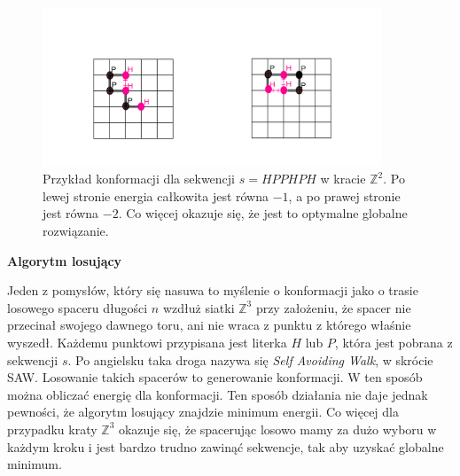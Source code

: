 \documentclass[leqno,10pt]{article}
\begin{document}
\begin{figure}[!htbp]
    \centering
    \includegraphics[width=0.9\textwidth]{diagram.png}
    \caption{Przykład konformacji dla sekwencji $s={HPPHPH}$ w kracie $\mathbb{Z}^{2}$. Po lewej stronie energia całkowita jest równa $-1$, a po prawej stronie jest równa $-2$. Co więcej okazuje się, że jest to optymalne globalne rozwiązanie. }
\end{figure}


\textbf{Algorytm losujący}

Jeden z pomysłów, który się nasuwa to myślenie o konformacji jako o trasie losowego spaceru długości $n$ wzdłuż siatki $\mathbb{Z}^{3}$ przy założeniu, że spacer nie przecinał swojego dawnego toru, ani nie wraca z punktu z którego właśnie wyszedł. Każdemu punktowi przypisana jest literka $H$ lub $P$, która jest pobrana z sekwencji $s$. Po angielsku taka droga nazywa się \textit{Self Avoiding Walk}, w skrócie SAW. Losowanie takich spacerów to generowanie konformacji. W ten sposób można obliczać energię dla konformacji. Ten sposób działania nie daje jednak pewności, że algorytm losujący znajdzie minimum energii. Co więcej dla przypadku kraty $\mathbb{Z}^3$ okazuje się, że spacerując losowo mamy za dużo wyboru w każdym kroku i jest bardzo trudno zawinąć sekwencje, tak aby uzyskać globalne minimum. 
\end{document}
